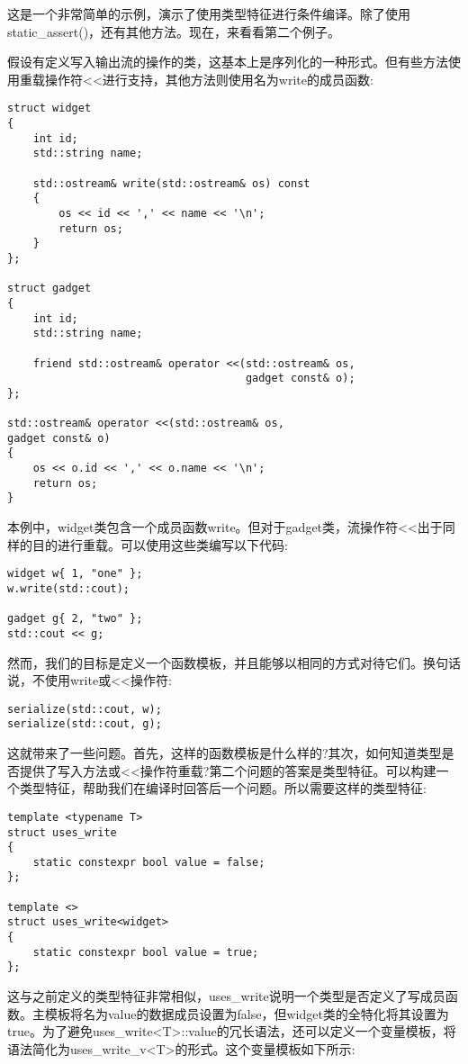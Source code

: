 这是一个非常简单的示例，演示了使用类型特征进行条件编译。除了使用static\_assert()，还有其他方法。现在，来看看第二个例子。

假设有定义写入输出流的操作的类，这基本上是序列化的一种形式。但有些方法使用重载操作符<{}<进行支持，其他方法则使用名为write的成员函数:

\begin{lstlisting}[style=styleCXX]
struct widget
{
	int id;
	std::string name;
	
	std::ostream& write(std::ostream& os) const
	{
		os << id << ',' << name << '\n';
		return os;
	}
};

struct gadget
{
	int id;
	std::string name;
	
	friend std::ostream& operator <<(std::ostream& os,
	                                 gadget const& o);
};

std::ostream& operator <<(std::ostream& os,
gadget const& o)
{
	os << o.id << ',' << o.name << '\n';
	return os;
}
\end{lstlisting}

本例中，widget类包含一个成员函数write。但对于gadget类，流操作符<{}<出于同样的目的进行重载。可以使用这些类编写以下代码:

\begin{lstlisting}[style=styleCXX]
widget w{ 1, "one" };
w.write(std::cout);

gadget g{ 2, "two" };
std::cout << g;
\end{lstlisting}

然而，我们的目标是定义一个函数模板，并且能够以相同的方式对待它们。换句话说，不使用write或<{}<操作符:

\begin{lstlisting}[style=styleCXX]
serialize(std::cout, w);
serialize(std::cout, g);
\end{lstlisting}

这就带来了一些问题。首先，这样的函数模板是什么样的?其次，如何知道类型是否提供了写入方法或<{}<操作符重载?第二个问题的答案是类型特征。可以构建一个类型特征，帮助我们在编译时回答后一个问题。所以需要这样的类型特征:

\begin{lstlisting}[style=styleCXX]
template <typename T>
struct uses_write
{
	static constexpr bool value = false;
};

template <>
struct uses_write<widget>
{
	static constexpr bool value = true;
};
\end{lstlisting}

这与之前定义的类型特征非常相似，uses\_write说明一个类型是否定义了写成员函数。主模板将名为value的数据成员设置为false，但widget类的全特化将其设置为true。为了避免uses\_write<T>::value的冗长语法，还可以定义一个变量模板，将语法简化为uses\_write\_v<T>的形式。这个变量模板如下所示:

